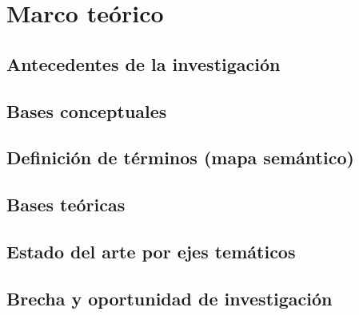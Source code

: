 \chapter{Marco teórico}
\label{cap:marco}

\section{Antecedentes de la investigación}
\label{sec:antecedentes}


\section{Bases conceptuales}
\label{sec:bases-conceptuales}


\section{Definición de términos (mapa semántico)}
\label{sec:glosario}


\section{Bases teóricas}
\label{sec:bases-teoricas}


\section{Estado del arte por ejes temáticos}
\label{sec:estado-arte}


\section{Brecha y oportunidad de investigación}
\label{sec:brecha}

